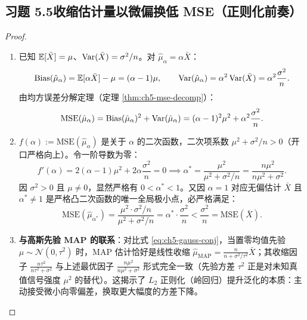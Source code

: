 \subsection*{习题 5.5\quad 收缩估计量以微偏换低 MSE（正则化前奏）}
\begin{proof}
\begin{enumerate}[label=(\arabic*), leftmargin=1.8em]
  \item 已知 $\mathbb{E}[\bar{X}] = \mu$、$\operatorname{Var}(\bar{X}) = \sigma^2/n$。对 $\hat{\mu}_\alpha = \alpha \bar{X}$：
  \[
    \operatorname{Bias}(\hat{\mu}_\alpha) = \mathbb{E}[\alpha\bar{X}] - \mu = (\alpha - 1)\mu, \qquad
    \operatorname{Var}(\hat{\mu}_\alpha) = \alpha^2 \operatorname{Var}(\bar{X}) = \alpha^2 \frac{\sigma^2}{n}.
  \]
  由均方误差分解定理（定理 \ref{thm:ch5-mse-decomp}）：
  \[
    \mathrm{MSE}(\hat{\mu}_\alpha) = \operatorname{Bias}(\hat{\mu}_\alpha)^2 + \operatorname{Var}(\hat{\mu}_\alpha)
    = (\alpha - 1)^2 \mu^2 + \alpha^2 \frac{\sigma^2}{n}.
  \]
  \item $f(\alpha) := \mathrm{MSE}(\hat{\mu}_\alpha)$ 是关于 $\alpha$ 的二次函数，二次项系数 $\mu^2 + \sigma^2/n > 0$（开口严格向上）。令一阶导数为零：
  \[
    f'(\alpha) = 2(\alpha - 1)\mu^2 + 2\alpha\frac{\sigma^2}{n} = 0
    \implies \alpha^* = \frac{\mu^2}{\mu^2 + \sigma^2/n} = \frac{n\mu^2}{n\mu^2 + \sigma^2}.
  \]
  因 $\sigma^2 > 0$ 且 $\mu \neq 0$，显然严格有 $0 < \alpha^* < 1$。又因 $\alpha = 1$ 对应无偏估计 $\bar{X}$ 且 $\alpha^* \neq 1$ 是严格凸二次函数的唯一全局极小点，必严格满足：
  \[
    \mathrm{MSE}(\hat{\mu}_{\alpha^*}) = \frac{\mu^2 \cdot \sigma^2/n}{\mu^2 + \sigma^2/n}
    = \alpha^* \cdot \frac{\sigma^2}{n} < \frac{\sigma^2}{n} = \mathrm{MSE}(\bar{X}).
  \]
  \item \textbf{与高斯先验 MAP 的联系}：对比式 \eqref{eq:ch5-gauss-conj}，当置零均值先验 $\mu \sim \mathcal{N}(0, \tau^2)$ 时，MAP 估计恰好是线性收缩 $\hat{\mu}_{\mathrm{MAP}} = \frac{n}{n + \sigma^2/\tau^2}\bar{X}$；其收缩因子 $\frac{n\tau^2}{n\tau^2 + \sigma^2}$ 与上述最优因子 $\frac{n\mu^2}{n\mu^2 + \sigma^2}$ 形式完全一致（先验方差 $\tau^2$ 正是对未知真值信号强度 $\mu^2$ 的替代）。这揭示了 $L_2$ 正则化（岭回归）提升泛化的本质：主动接受微小向零偏差，换取更大幅度的方差下降。
\end{enumerate}
\end{proof}

